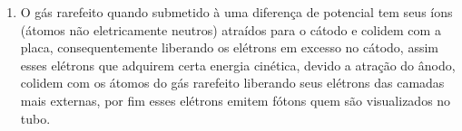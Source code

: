 \documentclass[12pt,a4paper]{article}
\begin{document}
\begin{enumerate}
    \item O gás rarefeito quando submetido à uma diferença de potencial tem seus íons (átomos não eletricamente neutros) atraídos para o cátodo e colidem com a placa, consequentemente liberando os elétrons em excesso no cátodo, assim esses elétrons que  adquirem certa energia cinética, devido a atração do ânodo, colidem com os átomos do gás rarefeito liberando seus elétrons das camadas mais externas, por fim esses elétrons emitem fótons quem são visualizados no tubo.

   
    
\end{enumerate}

\noindent\makebox[\linewidth]{\rule{\paperwidth}{0.4pt}}

\newpage


\end{document}
